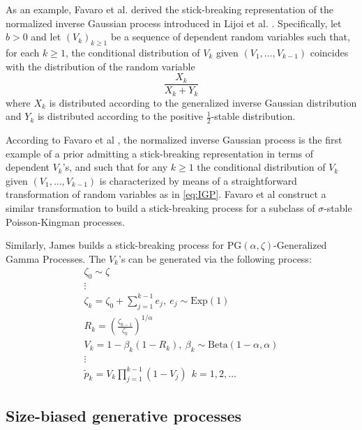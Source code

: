 As an example, Favaro et al. \cite{Favaro:2012ht} derived the stick-breaking representation of the normalized inverse Gaussian process introduced in Lijoi et al. \cite{Lijoi:2005ku}. Specifically, let $b > 0$ and let $(V_k)_{k \ge 1}$ be a sequence of dependent random variables such that, for each $k \ge 1$, the conditional distribution of $V_k$ given $(V_1,\dots,V_{k-1})$ coincides with the distribution of the random variable
\begin{equation} \label{eq:IGP}
\frac{X_k}{X_k + Y_k}
\end{equation}
where $X_k$ is distributed according to the generalized inverse Gaussian distribution and $Y_k$ is distributed according to the positive $\frac{1}{2}$-stable distribution.

According to Favaro et al \cite{Favaro:2014bo}, the normalized inverse Gaussian process \cite{Favaro:2012ht} is the first example of a prior admitting a stick-breaking representation in terms of dependent  $V_k$'s, and such that for any $k \ge 1$ the conditional distribution of $V_k$ given $(V_1,\dots,V_{k-1})$ is characterized by means of a straightforward transformation of random variables as in \ref{eq:IGP}.
Favaro et al \cite{Favaro:2014bo} construct a similar transformation to build a stick-breaking process for a subclass of $\sigma$-stable Poisson-Kingman processes.

Similarly, James \cite{James:2013uk} builds a stick-breaking process for $\text{PG}(\alpha,\zeta)$-Generalized Gamma Processes. The $V_k$'s can be generated via the following process:
\begin{gather*}
\zeta_0 \sim \zeta \\
\vdots \\
\zeta_k = \zeta_0 + \sum_{j=1}^{k-1}{e_j},\ e_j \sim \text{Exp}(1) \\
R_k = \left(\frac{\zeta_{k-1}}{\zeta_k}\right)^{1/\alpha} \\
V_k = 1 - \beta_k(1 - R_k), \ \beta_k \sim \text{Beta}(1-\alpha,\alpha) \\
\vdots \\
\tilde{p}_k = V_k \prod_{j=1}^{k-1}(1-V_j) \ \ k= 1,2,\dots
\end{gather*}

\subsection{Size-biased generative processes}

